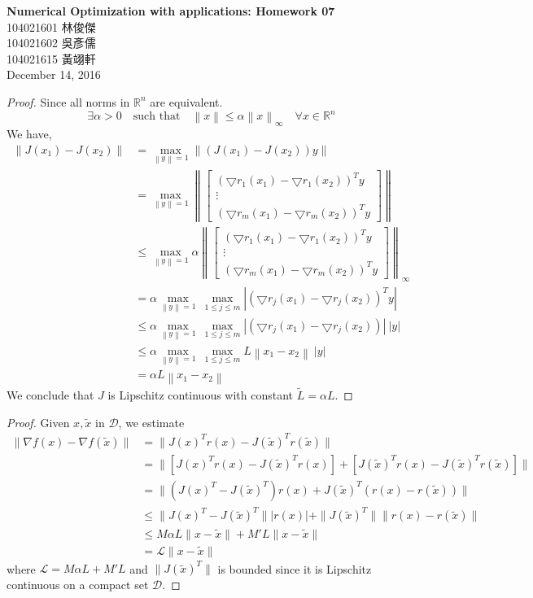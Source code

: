 \documentclass[11pt,a4paper]{article}
\renewcommand{\(}{\left(}
\renewcommand{\)}{\right)}
\newcommand{\norm}[1]{\left\|#1\right\|}
\renewcommand{\title}{Numerical Optimization with applications: Homework 07}
\renewcommand{\author}{104021601 林俊傑\\104021602 吳彥儒\\104021615 黃翊軒}
\renewcommand{\maketitle}{\begin{center}\textbf{\Large\title}\\[6pt] {\author}\\[6pt] {\color{Gray}\footnotesize December 14, 2016}\end{center}}
\begin{document}
  \maketitle
  \begin{proof}
  Since all norms in $\mathbb{R}^n$ are equivalent.
  \[ \exists \alpha>0 \quad \mbox{such that} \quad \norm{x} \leq \alpha \norm{x}_{\infty} \quad \forall x \in \mathbb{R}^n \]
  We have,\\
  \begin{align*}  
   \norm{J(x_1)-J(x_2)} &= \max_{\norm{y}=1} \norm{(J(x_1)-J(x_2))y}\\
   &= \max_{\norm{y}=1} \norm{
	\begin{bmatrix}
	(\bigtriangledown r_1(x_1)-\bigtriangledown r_1(x_2))^Ty \\
	\vdots\\
	(\bigtriangledown r_m(x_1)-\bigtriangledown r_m(x_2))^Ty
	\end{bmatrix}	   
   }\\
   &\leq \max_{\norm{y}=1} \alpha \norm{
	\begin{bmatrix}
	(\bigtriangledown r_1(x_1)-\bigtriangledown r_1(x_2))^Ty \\
	\vdots\\
	(\bigtriangledown r_m(x_1)-\bigtriangledown r_m(x_2))^Ty
	\end{bmatrix}	   
   }_{\infty}\\
   &= \alpha \max_{\norm{y}=1}~\max_{1 \leq j \leq m} |(\bigtriangledown r_j(x_1)-\bigtriangledown r_j(x_2))^Ty|\\
   &\leq \alpha \max_{\norm{y}=1}~\max_{1 \leq j \leq m} |(\bigtriangledown r_j(x_1)-\bigtriangledown r_j(x_2))|~|y|\\
   &\leq \alpha \max_{\norm{y}=1}~\max_{1 \leq j \leq m} L\norm{x_1-x_2}~|y|\\
   &= \alpha L \norm{x_1-x_2}
  \end{align*}
  We conclude that $J$ is Lipschitz continuous with constant $\tilde{L}=\alpha L$.
  \end{proof}
  
\begin{proof}
	Given $x,\tilde{x}$ in $\mathcal{D}$, we estimate
	\begin{align*}
	\|\nabla f(x)-\nabla f(\tilde{x})\| &= \|J(x)^Tr(x)-J(\tilde{x})^Tr(\tilde{x})\|\\
	&= \|\left[J(x)^Tr(x)-J(\tilde{x})^Tr(x)\right] + \left[J(\tilde{x})^Tr(x)-J(\tilde{x})^Tr(\tilde{x})\right]\|\\
	&= \|\left(J(x)^T-J(\tilde{x})^T\right)r(x) + J(\tilde{x})^T\left(r(x)-r(\tilde{x})\right)\|\\
	& \le \|J(x)^T-J(\tilde{x})^T\||r(x)|+\|J(\tilde{x})^T\|\|r(x)-r(\tilde{x})\|\\
	&\le M\alpha L \|x-\tilde{x}\|+M'L\|x-\tilde{x}\|\\
	&= \mathcal{L}\|x-\tilde{x}\|
	\end{align*}
	where $\mathcal{L} =  M\alpha L+M'L$ and $\|J(\tilde{x})^T\|$ is bounded since it is Lipschitz continuous on a compact set $\mathcal{D}$.
	
\end{proof}
\end{document}
